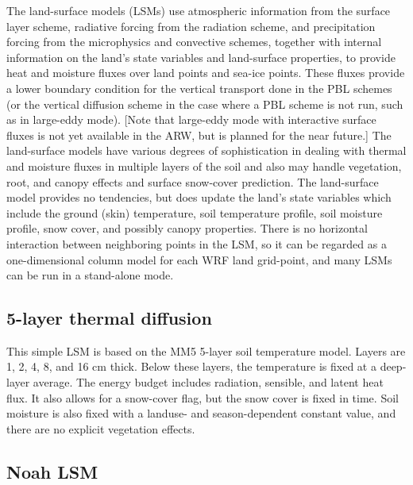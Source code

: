 The land-surface models (LSMs) use atmospheric information from the surface layer scheme, 
radiative forcing from the radiation scheme, and precipitation forcing from the 
microphysics and convective schemes, together with internal information on the 
land's state variables and land-surface properties, to provide heat and moisture 
fluxes over land points and sea-ice points. These fluxes provide a lower boundary 
condition for the vertical transport done in the PBL schemes (or the vertical 
diffusion scheme in the case where a PBL scheme is not run, such as in 
large-eddy mode). [Note that large-eddy mode with interactive surface fluxes is 
not yet available in the ARW, but is planned for the near future.] The land-surface 
models have various degrees of sophistication in dealing with thermal and moisture 
fluxes in multiple layers of the soil and also may handle vegetation, root, and 
canopy effects and surface snow-cover prediction. The land-surface model provides 
no tendencies, but does update the land's state variables which include the ground (skin) 
temperature, soil temperature profile, soil moisture profile, snow cover, and 
possibly canopy properties. There is no horizontal interaction between neighboring
points in the LSM, so it can be regarded as a one-dimensional column model for
each WRF land grid-point, and many LSMs can be run in a stand-alone mode.

\subsection{5-layer thermal diffusion}

This simple LSM is based on the MM5 5-layer soil temperature model. Layers are 
1, 2, 4, 8, and 16 cm thick. Below these layers, the temperature is fixed at a
deep-layer average. The energy budget includes radiation, sensible, and 
latent heat flux. It also allows for a snow-cover flag, but the snow 
cover is fixed in time. Soil moisture is also fixed with a landuse- and 
season-dependent constant value, and there are no explicit vegetation effects.

\subsection{Noah LSM}

